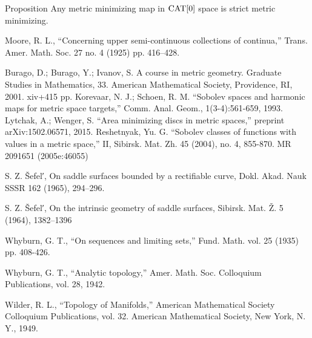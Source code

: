 \documentclass[a4paper,10pt]{amsart}
\begin{document}
\begin{thm}{Proposition}\label{prop:strict-mm}
Any metric minimizing map in $\mathop{\rm CAT}\nolimits[0]$ space is strict metric minimizing.
\end{thm}


\begin{thebibliography}{52}
Moore, R. L.,
``Concerning upper semi-continuous collections of continua,''
Trans. Amer. Math. Soc. 27 no. 4 (1925) pp. 416--428.

Burago, D.; Burago, Y.; Ivanov, S.
A course in metric geometry.
Graduate Studies in Mathematics, 33. American Mathematical Society, Providence, RI, 2001. xiv+415 pp.
Korevaar, N. J.; Schoen, R. M. ``Sobolev spaces and harmonic maps for metric space targets,'' Comm. Anal. Geom., 1(3-4):561-659, 1993.
Lytchak, A.; Wenger, S. ``Area minimizing discs in metric spaces,'' preprint arXiv:1502.06571, 2015.
Reshetnyak, Yu. G. ``Sobolev classes of functions with values in a metric space,'' II, Sibirsk. Mat. Zh. 45 (2004), no. 4, 855-870. MR 2091651 (2005e:46055)

 S. Z. \v{S}efel′, On saddle surfaces bounded by a rectifiable curve, Dokl. Akad. Nauk SSSR 162 (1965), 294--296.

 S. Z. \v{S}efel′, On the intrinsic geometry of saddle surfaces, Sibirsk. Mat. Ž. 5 (1964), 1382--1396

Whyburn, G. T., ``On sequences and limiting sets,'' Fund. Math. vol. 25 (1935) pp. 408-426.

Whyburn, G. T., ``Analytic topology,'' Amer. Math. Soc. Colloquium Publications, vol. 28, 1942.

Wilder, R. L., ``Topology of Manifolds,'' American Mathematical Society Colloquium Publications, vol. 32. American Mathematical
Society, New York, N. Y., 1949.
\end{thebibliography}
\end{document}
